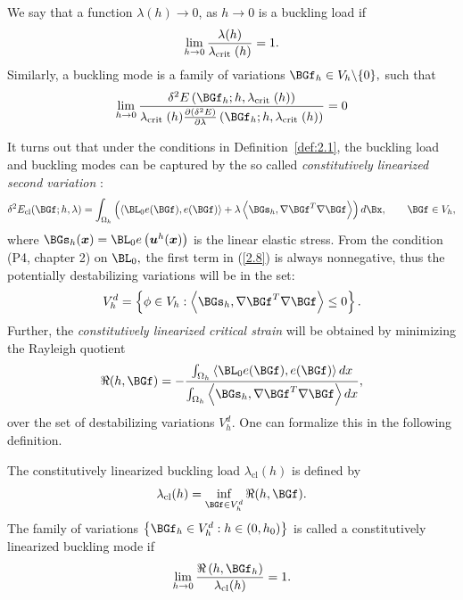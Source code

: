 \begin{definition}
\label{def:2.2} 
We say that a function $\lambda(h) \rightarrow 0$, as $h \rightarrow 0$ is a buckling load if
$$
\lim _{h \rightarrow 0} \frac{\lambda(h)}{\lambda_{\text {crit }}(h)}=1.
$$
Similarly, a buckling mode is a family of variations $\BGf_{h} \in V_h \backslash\{0\},$ such that
$$
\lim _{h \rightarrow 0} \frac{\delta^{2} E\left(\BGf_{h} ; h, \Gl_{\text {crit }}(h)\right)}{\Gl_{\text {crit }}(h)\frac{\partial\left(\delta^{2} E\right)}{\partial \Gl}\left(\BGf_{h} ; h, \Gl_{\text {crit }}(h)\right)}=0
$$
\end{definition}


It turns out that under the conditions in Definition~\ref{def:2.1}, the buckling load and buckling modes can be captured by the so called \textit{constitutively linearized second variation} \cite{bib:Gra.Tru.}:
\begin{equation}
\label{2.8}
\delta^{2} E_{\mathrm{cl}}(\BGf ; h, \Gl)=\int_{\Omega_h}\left(\left \langle\BL_{0} e(\BGf), e(\BGf)\right\rangle+\lambda\left\langle\BGs_{h}, \nabla \BGf^{T} \nabla \BGf\right\rangle\right) d\Bx, \qquad \BGf \in V_h,
\end{equation}
where $\BGs_{h}(\boldsymbol{x})=\BL_{0} e\left(\boldsymbol{u}^{h}(\boldsymbol{x})\right)$ is the linear elastic stress.
From the condition (P4, chapter 2) on $\BL_0,$ the first term in (\ref{2.8}) is always nonnegative, thus the potentially destabilizing variations will be in the set: 
\begin{equation}
\label{2.9}
V_h^d=\left\{\phi \in V_h :\left\langle\BGs_h, \nabla \BGf^{T} \nabla \BGf\right\rangle\leq 0\right\}.
\end{equation}
Further, the \textit{constitutively linearized critical strain} will be obtained by minimizing the Rayleigh quotient
\begin{equation}
\label{2.10}
\Re(h, \BGf)=-\frac{\int_{\Omega_{h}}\left\langle \BL_{0} e(\BGf), e(\BGf)\right\rangle d x}{\int_{\Omega_{h}}\left\langle\BGs_{h}, \nabla \BGf^{T} \nabla\BGf \right\rangle d x},
\end{equation}
over the set of destabilizing variations $V_h^d.$ One can formalize this in the following definition.
\begin{definition}
\label{def:2.3}
The constitutively linearized buckling load $\lambda_{\mathrm{cl}}(h)$ is defined by
\begin{equation}
\label{2.11}
\lambda_{\mathrm{cl}}(h)=\inf _{\BGf \in V_h^d} \Re(h, \BGf).
\end{equation}
The family of variations $\left\{\BGf_{h} \in V_h^d: h \in\left(0, h_{0}\right)\right\}$ is called a constitutively linearized buckling mode if
\begin{equation}
\label{2.12}
\lim _{h \rightarrow 0} \frac{\Re\left(h, \BGf_{h}\right)}{\Gl_{\mathrm{cl}}(h)}=1.
\end{equation}
\end{definition}

